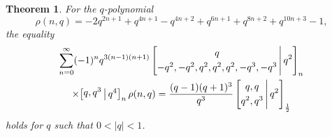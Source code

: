 \documentclass[12pt]{article}
\newtheorem{theorem}{Theorem}
\begin{document}
\begin{theorem}\label{qnegquarttheorem}
 For the $q$-polynomial 
 $$\rho(n, q) = -2 q^{2 n+1}+q^{4 n+1}-q^{4 n+2}+q^{6 n+1}+q^{8 n+2}+q^{10 n+3}-1,$$ 
\noindent the equality 
\begin{multline*}
 \sum_{n=0}^{\infty} (-1)^n q^{3(n-1) (n+1)} 
 \left[ \begin{matrix} q \vspace{1mm} \\ 
 -q^2, -q^2, q^2, q^2, q^2, -q^3, -q^3 \end{matrix} \, \Bigg| \, q^2 \right]_{n} \\ 
 \times \big[ \begin{matrix} q, q^3 \vspace{1mm} 
 \end{matrix} \, \big| \, q^4 \big]_{n} \, \rho(n, q) = 
 \frac{(q-1) (q+1)^3}{q^3} 
 \left[ \begin{matrix} q, q \vspace{1mm} \\ 
 q^2, q^3 \end{matrix} \, \Bigg| \, q^2 \right]_{\frac{1}{2}} 
\end{multline*}
 holds for $q$ such that $0< |q| < 1$. 
\end{theorem}
\end{document}
